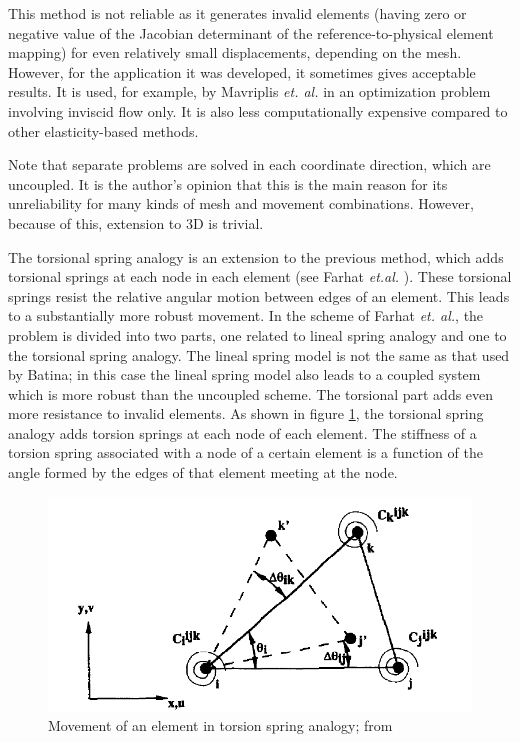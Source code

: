  This method is not reliable as it generates invalid elements (having zero or negative value of the Jacobian determinant of the reference-to-physical element mapping) for even relatively small displacements, depending on the mesh. However, for the application it was developed, it sometimes gives acceptable results. It is used, for example, by Mavriplis \emph{et. al.} \cite{appl:mavriplis} in an optimization problem involving inviscid flow only. It is also less computationally expensive compared to other elasticity-based methods.
 
 Note that separate problems are solved in each coordinate direction, which are uncoupled. It is the author's opinion that this is the main reason for its unreliability for many kinds of mesh and movement combinations. However, because of this, extension to 3D is trivial.
 
 The torsional spring analogy is an extension to the previous method, which adds torsional springs at each node in each element (see Farhat \emph{et.al.} \cite{mm:torsionsprings}).
 These torsional springs resist the relative angular motion between edges of an element. This leads to a substantially more robust movement. In the scheme of Farhat \emph{et. al.}, the problem is divided into two parts, one related to lineal spring analogy and one to the torsional spring analogy. The lineal spring model is not the same as that used by Batina; in this case the lineal spring model also leads to a coupled system which is more robust than the uncoupled scheme. The torsional part adds even more resistance to invalid elements. As shown in figure \ref{f:torsion}, the torsional spring analogy adds torsion springs at each node of each element. The stiffness of a torsion spring associated with a node of a certain element is a function of the angle formed by the edges of that element meeting at the node.
 
 \begin{figure}
 	\centering
 	\includegraphics[scale=0.25]{torsionspring}
 	\caption{Movement of an element in torsion spring analogy; from \cite{mm:torsionsprings}}
 	\label{f:torsion}
 \end{figure}
 
